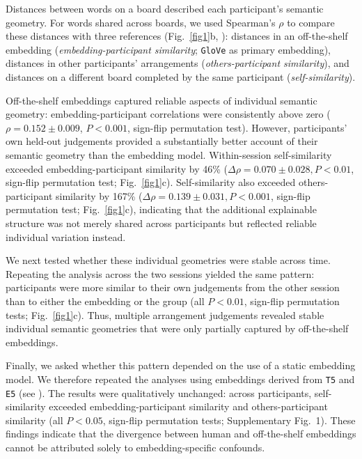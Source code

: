 \documentclass[pdflatex,sn-mathphys]{sn-jnl}
\begin{document}
Distances between words on a board described each participant's semantic geometry. For words shared across boards, we used Spearman's $\rho$ to compare these distances with three references (Fig.~\ref{fig1}b, ): distances in an off-the-shelf embedding (\textit{embedding-participant similarity}; \texttt{GloVe}\cite{glove} as primary embedding), distances in other participants' arrangements (\textit{others-participant similarity}), and distances on a different board completed by the same participant (\textit{self-similarity}). 

Off-the-shelf embeddings captured reliable aspects of individual semantic geometry: embedding-participant correlations were consistently above zero ($\rho = 0.152\pm0.009$, $P < 0.001$, sign-flip permutation test). However, participants' own held-out judgements provided a substantially better account of their semantic geometry than the embedding model. Within-session self-similarity exceeded embedding-participant similarity by 46\% ($\Delta\rho = 0.070\pm0.028, P < 0.01$, sign-flip permutation test; Fig.~\ref{fig1}c). Self-similarity also exceeded others-participant similarity by 167\% ($\Delta\rho = 0.139\pm0.031, P < 0.001$, sign-flip permutation test; Fig.~\ref{fig1}c), indicating that the additional explainable structure was not merely shared across participants but reflected reliable individual variation instead.

We next tested whether these individual geometries were stable across time. Repeating the analysis across the two sessions yielded the same pattern: participants were more similar to their own judgements from the other session than to either the embedding or the group (all $P < 0.01$, sign-flip permutation tests; Fig.~\ref{fig1}c). Thus, multiple arrangement judgements revealed stable individual semantic geometries that were only partially captured by off-the-shelf embeddings.

Finally, we asked whether this pattern depended on the use of a static embedding model. We therefore repeated the analyses using embeddings derived from \texttt{T5}\cite{t5-large} and \texttt{E5}\cite{e5-large} (see ). The results were qualitatively unchanged: across participants, self-similarity exceeded embedding-participant similarity and others-participant similarity (all $P < 0.05$, sign-flip permutation tests; Supplementary Fig.~1). These findings indicate that the divergence between human and off-the-shelf embeddings cannot be attributed solely to embedding-specific confounds.
\end{document}
